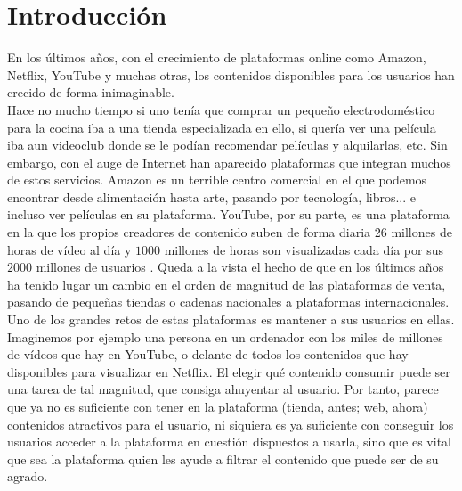 \chapter{Introducción}\label{chap:introduccion}

En los últimos años, con el crecimiento de plataformas online como Amazon, Netflix, YouTube y muchas otras, los contenidos disponibles para los usuarios han crecido de forma inimaginable. \\

Hace no mucho tiempo si uno tenía que comprar un pequeño electrodoméstico para la cocina iba a una tienda especializada en ello, si quería ver una película iba aun videoclub donde se le podían recomendar películas y alquilarlas, etc. Sin embargo, con el auge de Internet han aparecido plataformas que integran muchos de estos servicios. Amazon es un terrible centro comercial en el que podemos encontrar desde alimentación hasta arte, pasando por tecnología, libros... e incluso ver películas en su plataforma. YouTube, por su parte, es una plataforma en la que los propios creadores de contenido suben de forma diaria $26$ millones de horas de vídeo al día y $1000$ millones de horas son visualizadas cada día por sus $2000$ millones de usuarios \cite{YoutubeStats}. Queda a la vista el hecho de que en los últimos años ha tenido lugar un cambio en el orden de magnitud de las plataformas de venta, pasando de pequeñas tiendas o cadenas nacionales a plataformas internacionales.\\

Uno de los grandes retos de estas plataformas es mantener a sus usuarios en ellas. Imaginemos por ejemplo una persona en un ordenador con los miles de millones de vídeos que hay en YouTube, o delante de todos los contenidos que hay disponibles para visualizar en Netflix. El elegir qué contenido consumir puede ser una tarea de tal magnitud, que consiga ahuyentar al usuario. Por tanto, parece que ya no es suficiente con tener en la plataforma (tienda, antes; web, ahora) contenidos atractivos para el usuario, ni siquiera es ya suficiente con conseguir los usuarios acceder a la plataforma en cuestión dispuestos a usarla, sino que es vital que sea la plataforma quien les ayude a filtrar el contenido que puede ser de su agrado.\\



